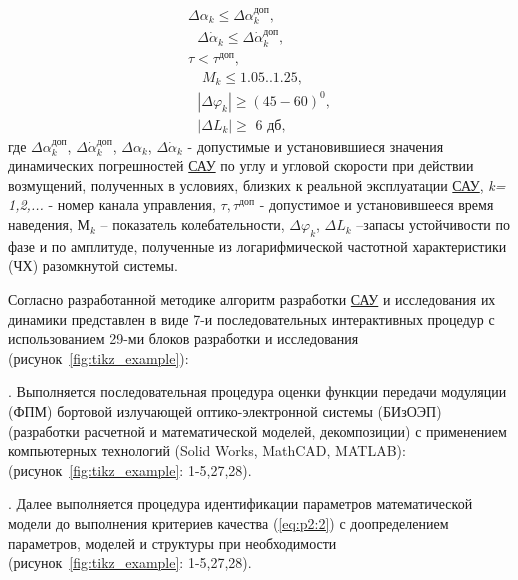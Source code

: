\begin{equation}
\label{eq:p2:2}
\begin{alignedat}{2}
\varDelta \alpha _k\leqslant \varDelta \alpha _{k}^{\textit{доп}},
\\
\,\,\,\,\varDelta \dot{\alpha}_k\leqslant \varDelta \dot{\alpha}_{k}^{\textit{доп}},
\\
\tau < \tau^\textit{доп},
\\
\,\,\,\,\,\,M_k\leqslant \text{1.05..1.25,}
\\
\,\,\,\,\left| \left. \varDelta \varphi_k \right| \right. \geqslant \left( 45-60 \right) ^0,
\\
\,\,\,\,\left| \left. \varDelta L_k \right|\geqslant \,\,\textit{6 дб}, \right. 
\end{alignedat}
\end{equation}
где $\varDelta \alpha^{\textit{доп}}_{k}$, 
$\varDelta \dot{\alpha}^{\textit{доп}}_{k}$, 
$\varDelta \alpha _k$, 
$\varDelta \dot{\alpha}_k$ 
- допустимые и установившиеся значения динамических погрешностей \hyperref[acroSAU]{САУ} по углу и угловой скорости при действии возмущений, полученных в условиях, близких к реальной эксплуатации \hyperref[acroSAU]{САУ}, \textit{k= 1,2,...} - номер канала управления, $\tau, \tau^\textit{доп}$ - допустимое и установившееся время наведения, $М_k$ – показатель колебательности, $\varDelta \varphi_k$, $\varDelta L_k$ –запасы устойчивости по фазе и по амплитуде, полученные из логарифмической частотной характеристики (ЧХ) разомкнутой системы.%

Согласно разработанной методике алгоритм разработки \hyperref[acroSAU]{САУ} и исследования их динамики представлен в виде 7-и последовательных интерактивных процедур с использованием 29-ми блоков разработки и исследования (рисунок~\ref{fig:tikz_example}):

 . Выполняется последовательная процедура оценки функции передачи модуляции (ФПМ) бортовой излучающей оптико-электронной системы (БИзОЭП) (разработки расчетной и математической моделей, декомпозиции) с применением компьютерных технологий (Solid Works, MathCAD, MATLAB): (рисунок~\ref{fig:tikz_example}: 1-5,27,28).
	
 . Далее выполняется процедура идентификации параметров математической модели до выполнения критериев качества (\ref{eq:p2:2}) с доопределением параметров, моделей и структуры при необходимости (рисунок~\ref{fig:tikz_example}: 1-5,27,28).
	
